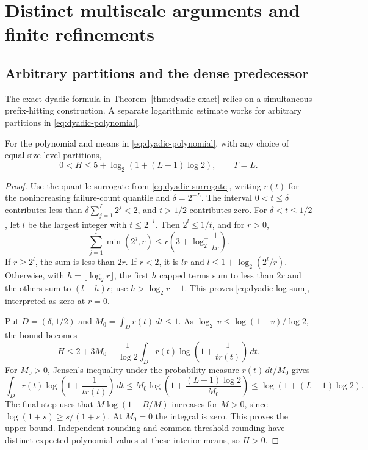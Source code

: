 \section{Distinct multiscale arguments and finite refinements}
\label{app:dyadic-alternatives}
\subsection{Arbitrary partitions and the dense predecessor}
The exact dyadic formula in Theorem~\ref{thm:dyadic-exact} relies on a
simultaneous prefix-hitting construction. A separate logarithmic estimate
works for arbitrary partitions in \eqref{eq:dyadic-polynomial}.

\begin{proposition}
\label{prop:arbitrary-dyadic}
For the polynomial and means in \eqref{eq:dyadic-polynomial}, with any
choice of equal-size level partitions,
\[
 0<H\le5+\log_2(1+(L-1)\log2),\qquad T=L.
\]
\end{proposition}
\begin{proof}
Use the quantile surrogate from \eqref{eq:dyadic-surrogate}, writing
$r(t)$ for the nonincreasing failure-count quantile and $\delta=2^{-L}$.
The interval $0<t\le\delta$ contributes less than
$\delta\sum_{j=1}^L2^j<2$, and $t>1/2$ contributes zero. For
$\delta<t\le1/2$, let $l$ be the largest integer with $t\le2^{-l}$.
Then $2^l\le1/t$, and for $r>0$,
\begin{equation}\label{eq:dyadic-log-sum}
 \sum_{j=1}^l\min(2^j,r)
 \le r\left(3+\log_2^+\frac1{tr}\right).
\end{equation}
If $r\ge2^l$, the sum is less than $2r$. If $r<2$, it is $lr$ and
$l\le1+\log_2(2^l/r)$. Otherwise, with $h=\lfloor\log_2r\rfloor$,
the first $h$ capped terms sum to less than $2r$ and the others sum to
$(l-h)r$; use $h>\log_2r-1$. This proves
\eqref{eq:dyadic-log-sum}, interpreted as zero at $r=0$.

Put $D=(\delta,1/2)$ and $M_0=\int_Dr(t)\,dt\le1$. As
$\log_2^+v\le\log(1+v)/\log2$, the bound becomes
\[
 H\le2+3M_0+\frac1{\log2}
       \int_Dr(t)\log\left(1+\frac1{tr(t)}\right)\,dt.
\]
For $M_0>0$, Jensen's inequality under the probability measure
$r(t)\,dt/M_0$ gives
\[
 \int_Dr(t)\log\left(1+\frac1{tr(t)}\right)\,dt
 \le M_0\log\left(1+\frac{(L-1)\log2}{M_0}\right)
 \le\log(1+(L-1)\log2).
\]
The final step uses that $M\log(1+B/M)$ increases for $M>0$, since
$\log(1+s)\ge s/(1+s)$. At $M_0=0$ the integral is zero. This proves
the upper bound. Independent rounding and common-threshold rounding
have distinct expected polynomial values at these interior means, so $H>0$.
\end{proof}


